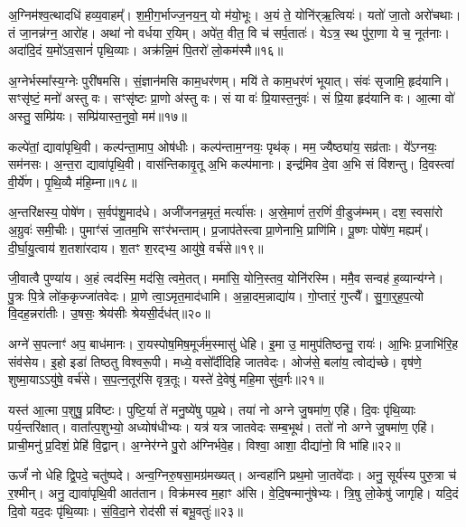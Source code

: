 अ॒ग्निम॑श्व॒त्थादधि॑ हव्य॒वाहम्᳚।
श॒मी॒ग॒र्भाज्ज॒नय॒न्॒ यो म॑यो॒भूः।
अ॒यं ते॒ योनि॑र्‌\mbox{}ऋ॒त्वियः॑।
यतो॑ जा॒तो अरो॑चथाः।
तं जा॒नन्न॑ग्न॒ आरो॑ह।
अथा॑ नो वर्धया र॒यिम्।
अपे॑त॒ वीत॒ वि च॑ सर्प॒तातः॑।
येऽत्र॒ स्थ पु॑रा॒णा ये च॒ नूत॑नाः।
अदा॑दि॒दं य॒मो॑\-ऽव॒सानं॑ पृथि॒व्याः।
अक्र॑न्नि॒मं पि॒तरो॑ लो॒कम॑स्मै॥१६॥\ip

अ॒ग्नेर्भस्मा᳚स्य॒ग्नेः पुरी॑षमसि।
सं॒ज्ञान॑मसि काम॒धर॑णम्।
मयि॑ ते काम॒धर॑णं भूयात्।
संवः॑ सृजामि॒ हृद॑यानि।
सꣳसृ॑ष्टं॒ मनो॑ अस्तु वः।
सꣳसृ॑ष्टः प्रा॒णो अ॑स्तु वः।
सं या वः॑ प्रि॒यास्त॒नुवः॑।
सं प्रि॒या हृद॑यानि वः।
आ॒त्मा वो॑ अस्तु॒ सम्प्रि॑यः।
सम्प्रि॑यास्त॒नुवो॒ मम॑॥१७॥\ip

कल्पे॑तां॒ द्यावा॑पृथि॒वी।
कल्प॑न्ता॒माप॒ ओष॑धीः।
कल्प॑न्ताम॒ग्नयः॒ पृथ॑क्।
मम॒ ज्यैष्ठ्या॑य॒ सव्र॑ताः।
ये᳚ऽग्नयः॒ सम॑नसः।
अ॒न्त॒रा द्यावा॑पृथि॒वी।
वास॑न्तिकावृ॒तू अ॒भि कल्प॑मानाः।
इन्द्र॑मिव दे॒वा अ॒भि सं वि॑शन्तु।
दि॒वस्त्वा॑ वी॒र्ये॑ण।
पृ॒थि॒व्यै म॑हि॒म्ना॥१८॥\ip

अ॒न्तरि॑क्षस्य॒ पोषे॑ण।
स॒र्वप॑शु॒माद॑धे।
अजी॑जनन्न॒मृतं॒ मर्त्या॑सः।
अ॒स्रे॒माणं॑ त॒रणिं॑ वी॒डुज॑म्भम्।
दश॒ स्वसा॑रो अ॒ग्रुवः॑ समी॒चीः।
पुमाꣳ॑सं जा॒तम॒भि सꣳर॑भन्ताम्।
प्र॒जा\-प॑तेस्त्वा प्रा॒णेनाभि॒ प्राणि॑मि।
पू॒ष्णः पोषे॑ण॒ मह्यम्᳚।
दी॒र्घा॒यु॒त्वाय॑ श॒तशा॑रदाय।
श॒तꣳ श॒रद्भ्य॒ आयु॑षे॒ वर्च॑से॥१९॥\ip

जी॒वात्वै पुण्या॑य।
अ॒हं त्वद॑स्मि॒ मद॑सि॒ त्वमे॒तत्।
ममा॑सि॒ योनि॒स्तव॒ योनि॑रस्मि।
ममै॒व सन्वह॑ ह॒व्यान्य॑ग्ने।
पु॒त्रः पि॒त्रे लो॑क॒कृज्जा॑तवेदः।
प्रा॒णे त्वा॒\-ऽमृत॒माद॑धामि।
अ॒न्ना॒दम॒न्नाद्या॑य।
गो॒प्तारं॒ गुप्त्यै᳚।
सु॒गा॒र्॒ह॒प॒त्यो वि॒दह॒न्नरा॑तीः।
उ॒षसः॒ श्रेय॑सीः श्रेयसी॒र्दध॑त्॥२०॥\ip

अग्ने॑ स॒पत्नाꣳ॑ अप॒ बाध॑मानः।
रा॒यस्पोष॒मिष॒मूर्ज॑म॒स्मासु॑ धेहि।
इ॒मा उ॒ मामुप॑तिष्ठन्तु॒ रायः॑।
आ॒भिः प्र॒जाभि॑रि॒ह संव॑सेय।
इ॒हो इडा॑ तिष्ठतु विश्वरू॒पी।
मध्ये॒ वसो᳚र्दीदिहि जातवेदः।
ओज॑से॒ बला॑य॒ त्वोद्य॑च्छे।
वृष॑णे॒ शुष्मा॒या\-ऽऽ\-यु॑षे॒ वर्च॑से।
स॒प॒त्न॒तूर॑सि वृत्र॒तूः।
यस्ते॑ दे॒वेषु॑ महि॒मा सु॑व॒र्गः॥२१॥\ip

यस्त॑ आ॒त्मा प॒शुषु॒ प्रवि॑ष्टः।
पुष्टि॒र्या ते॑ मनु॒ष्ये॑षु पप्र॒थे।
तया॑ नो अग्ने जु॒षमा॑ण॒ एहि॑।
दि॒वः पृ॑थि॒व्याः पर्य॒न्तरि॑क्षात्।
वाता᳚त्प॒शुभ्यो॒ अध्योष॑धीभ्यः।
यत्र॑ यत्र जातवेदः सम्ब॒भूथ॑।
ततो॑ नो अग्ने जु॒षमा॑ण॒ एहि॑।
प्राची॒मनु॑ प्र॒दिशं॒ प्रेहि॑ वि॒द्वान्।
अ॒ग्नेर॑ग्ने पु॒रो अ॑ग्निर्भवे॒ह।
विश्वा॒ आशा॒ दीद्या॑नो॒ वि भा॑हि॥२२॥\ip

ऊर्जं॑ नो धेहि द्वि॒पदे॒ चतु॑ष्पदे।
अन्व॒ग्निरु॒षसा॒मग्र॑मख्यत्।
अन्वहा॑नि प्रथ॒मो जा॒तवे॑दाः।
अनु॒ सूर्य॑स्य पुरु॒त्रा च॑ र॒श्मीन्।
अनु॒ द्यावा॑पृथि॒वी आत॑तान।
विक्र॑मस्व म॒हाꣳ अ॑सि।
वे॒दि॒षन्मानु॑षेभ्यः।
त्रि॒षु लो॒केषु॑ जागृहि।
यदि॒दं दि॒वो यद॒दः पृ॑थि॒व्याः।
सं॒वि॒दा॒ने रोद॑सी सं बभू॒वतुः॑॥२३॥\ip

